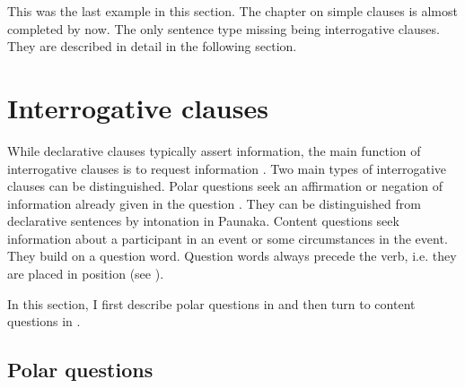 %

This was the last example in this section. The chapter on simple clauses is almost completed by now. The only sentence type missing being interrogative clauses. They are described in detail in the following section.

\section{Interrogative clauses}\label{sec:Questions}

While declarative clauses typically assert information, the main function of interrogative clauses is to request information \citep[294]{Payne1997}. Two main types of interrogative clauses can be distinguished. Polar questions seek an affirmation or negation of information already given in the question \citep[291]{Koenig2007}. They can be distinguished from declarative sentences by intonation in Paunaka. Content questions seek information about a participant in an event or some circumstances in the event. They build on a question word. Question words always precede the verb, i.e. they are placed in  position (see ).

In this section, I first describe polar questions in  and then turn to content questions in .


\subsection{Polar questions}\label{sec:PolarQuestions}

